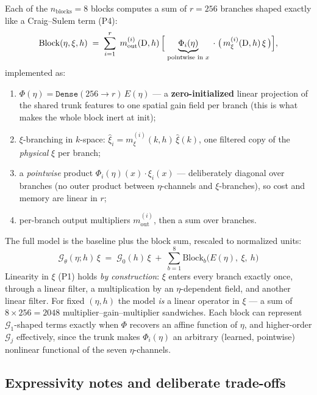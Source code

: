\documentclass[11pt,letterpaper]{article}
\newcommand{\Gop}{\mathcal{G}}
\newcommand{\D}{\mathrm{D}}
\begin{document}
Each of the $n_{\mathrm{blocks}}=8$ blocks computes a sum of $r=256$ branches
shaped exactly like a Craig--Sulem term (P4):
\[
\mathrm{Block}(\eta,\xi,h)
\;=\; \sum_{i=1}^{r}\;
m^{(i)}_{\mathrm{out}}(\D,h)\,\Bigl[\;\underbrace{\Phi_i(\eta)}_{\text{pointwise in }x}\;\cdot\;
\bigl(\,m^{(i)}_{\xi}(\D,h)\,\xi\,\bigr)\Bigr],
\]
implemented as:
\begin{enumerate}[leftmargin=1.6em, itemsep=1pt]
\item $\Phi(\eta) = \texttt{Dense}(256 \to r)\,E(\eta)$ --- a \textbf{zero-initialized}
      linear projection of the shared trunk features to one spatial gain field
      per branch (this is what makes the whole block inert at init);
\item $\xi$-branching in $k$-space: $\widehat{\xi}_i = m^{(i)}_{\xi}(k,h)\,\hat\xi(k)$,
      one filtered copy of the \emph{physical} $\xi$ per branch;
\item a \emph{pointwise} product $\Phi_i(\eta)(x)\cdot \xi_i(x)$ --- deliberately
      diagonal over branches (no outer product between $\eta$-channels and
      $\xi$-branches), so cost and memory are linear in $r$;
\item per-branch output multipliers $m^{(i)}_{\mathrm{out}}$, then a sum over branches.
\end{enumerate}
The full model is the baseline plus the block sum, rescaled to normalized units:
\[
\boxed{\;
\Gop_\theta(\eta;h)\,\xi
\;=\; \Gop_0(h)\,\xi
\;+\; \sum_{b=1}^{8} \mathrm{Block}_b\bigl(E(\eta),\ \xi,\ h\bigr)\;}
\]
Linearity in $\xi$ (P1) holds \emph{by construction}: $\xi$ enters every branch
exactly once, through a linear filter, a multiplication by an $\eta$-dependent
field, and another linear filter. For fixed $(\eta,h)$ the model \emph{is} a
linear operator in $\xi$ --- a sum of $8 \times 256 = 2048$
multiplier--gain--multiplier sandwiches. Each block can represent
$\Gop_1$-shaped terms exactly when $\Phi$ recovers an affine function of $\eta$,
and higher-order $\Gop_j$ effectively, since the trunk makes $\Phi_i(\eta)$ an
arbitrary (learned, pointwise) nonlinear functional of the seven $\eta$-channels.

\subsection{Expressivity notes and deliberate trade-offs}
\label{sec:expressivity}
\end{document}
